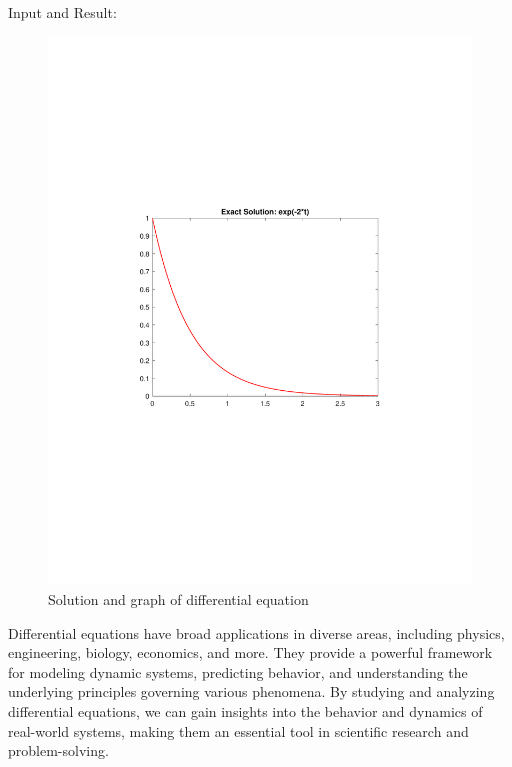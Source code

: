\documentclass[13pt,a4paper]{report}
\begin{document}
Input and Result:\\[-0.35cm]
\begin{center}
\begin{figure}[H]
\centering
\includegraphics[trim={3.6cm 8.35cm 3.25cm 8cm},clip,scale=0.75]{pdfs/ode.pdf}
\caption{Solution and graph of differential equation}
\end{figure}
\end{center}


Differential equations have broad applications in diverse areas, including physics, engineering, biology, economics, and more. They provide a powerful framework for modeling dynamic systems, predicting behavior, and understanding the underlying principles governing various phenomena. By studying and analyzing differential equations, we can gain insights into the behavior and dynamics of real-world systems, making them an essential tool in scientific research and problem-solving.
\end{document}
